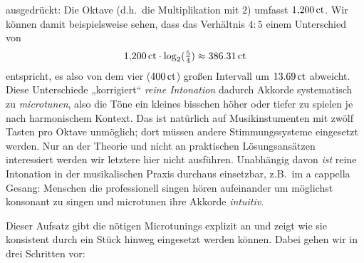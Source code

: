 \documentclass[ngerman,11pt]{scrartcl}
\begin{document}
ausgedrückt: Die Oktave (d.h.\ die Multiplikation mit $2$) umfasst
$1{,}200\,\mathrm{ct}$. Wir können damit beispielsweise sehen, dass das Verhältnis
$4:5$ einem Unterschied von
\[1{,}200\,\mathrm{ct}\cdot \log_2(\tfrac54) \approx 386.31\,\mathrm{ct}\]%
entspricht, es also von dem vier  ($400\,\mathrm{ct}$) großen Intervall um
$13.69\,\mathrm{ct}$ abweicht. Diese Unterschiede „korrigiert“
\emph{reine Intonation} dadurch Akkorde systematisch zu \emph{microtunen}, also
die Töne ein kleines bisschen höher oder tiefer zu spielen je nach harmonischem
Kontext. Das ist natürlich auf Musikinstumenten mit zwölf Tasten pro Oktave
unmöglich; dort müssen andere Stimmungssysteme eingesetzt werden. Nur an der
Theorie und nicht an praktischen Lösungsansätzen interessiert werden wir
letztere hier nicht ausführen. Unabhängig davon \emph{ist} reine Intonation in
der musikalischen Praxis durchaus einsetzbar, z.B.\ im a cappella Gesang:
Menschen die professionell singen hören aufeinander um möglichst konsonant zu
singen und microtunen ihre Akkorde \emph{intuitiv}.

Dieser Aufsatz gibt die nötigen Microtunings explizit an und zeigt wie sie
konsistent durch ein Stück hinweg eingesetzt werden können. Dabei gehen wir in
drei Schritten vor:
\end{document}

